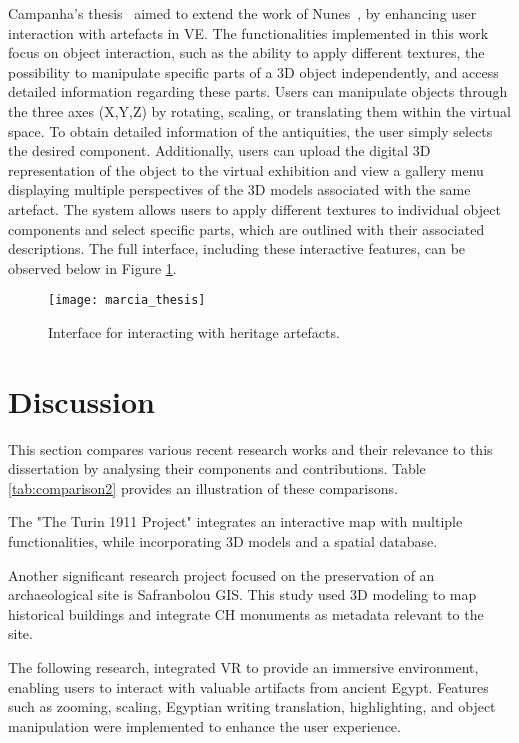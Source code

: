 Campanha's thesis~\cite{campanha2024heritage} aimed to extend the work of Nunes~\cite{nunes_thesis}, by enhancing user interaction with 
artefacts in \gls{VE}. The functionalities implemented in this work focus on object interaction, such as the ability to apply different textures, the possibility to manipulate specific parts of a \gls{3D} object independently, and access detailed information regarding these parts.
Users can manipulate objects through the three axes (X,Y,Z) by rotating, scaling, or translating them within the virtual space.
To obtain detailed information of the antiquities, the user simply selects the desired component.
Additionally, users can upload the digital \gls{3D} representation of the object to the virtual exhibition and view a gallery menu displaying multiple perspectives of the \gls{3D} models associated with the same artefact.
The system allows users to apply different textures to individual object components and select specific parts, which are outlined with their associated descriptions.
The full interface, including these interactive features, can be observed below in Figure \ref{fig:marcia_image}.

\begin{figure}[h!]
  \centering
  \texttt{[image: marcia\_thesis]}
  \caption{Interface for interacting with heritage artefacts.}
  \label{fig:marcia_image}
\end{figure}
\FloatBarrier

\section{Discussion}
\label{sec:discussion}

This section compares various recent research works and their relevance to this dissertation by analysing their components and contributions. Table \ref{tab:comparison2} provides an illustration of these comparisons.

The "The Turin 1911 Project" integrates an interactive map with multiple functionalities, while incorporating \gls{3D} models and a spatial database. 

Another significant research project focused on the preservation of an archaeological site is Safranbolou \gls{GIS}. This study used \gls{3D} modeling to map historical buildings and integrate \gls{CH} monuments as metadata relevant to the site.

The following research, integrated \gls{VR} to provide an immersive environment, enabling users to interact with valuable artifacts from ancient Egypt. Features such as zooming, scaling, Egyptian writing translation, highlighting, and object manipulation were implemented to enhance the user experience.

